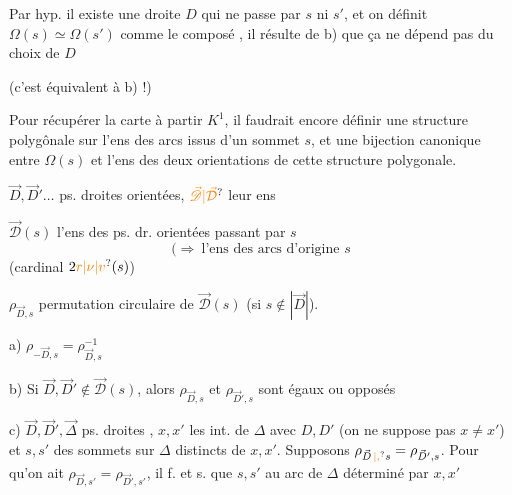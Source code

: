 Par hyp. il existe une droite $D$ qui ne passe
par $s$ ni $s'$, et  on définit $\Omega(s)\simeq\Omega(s')$ comme
le composé
, il résulte de b) que ça ne dépend pas du choix de $D$

(c'est  équivalent à b) !)

Pour  récupérer la carte à partir  $K^1$, il
faudrait encore définir une structure polygônale
sur l'ens des arcs issus d'un sommet $s$,
et une bijection canonique entre $\Omega(s)$ et
l'ens des deux orientations de cette structure
polygonale.

$\vec D,\vec D'\ldots$ ps. droites orientées, $\unsure{\vec{\mathscr D}|\vec{\mathcal D}}$ leur ens

$\vec{\mathscr D}(s)$ l'ens des ps. dr. orientées passant par $s$
\[
(\Longrightarrow\ \text{l'ens des arcs d'origine }s
\]
(cardinal $2\unsure{r|\nu|v}(s)$)

$\rho_{\vec D,s}$ permutation circulaire de $\vec{\mathscr D}(s)$ (si $s\notin|\vec D|$).

a) $\rho_{-\vec D,s}=\rho_{\vec D,s}^{-1}$

b) Si $\vec D,\vec D'\notin\vec{\mathscr D}(s)$, alors $\rho_{\vec D,s}$ et $\rho_{\vec D',s}$ sont égaux ou
opposés


c)  $\vec D,\vec D',\vec\Delta$ ps. droites , $x,x'$ les
int. de $\Delta$ avec $D,D'$ (on ne suppose pas $x\ne x'$)
et $s,s'$ des sommets sur $\Delta$ distincts de $x,x'$.
Supposons $\rho_{\vec D\unsure{\,|,}s}=\rho_{\vec D',s}$. Pour qu'on ait
$\rho_{\vec D,s'}=\rho_{\vec D',s'}$, il f. et s. que $s,s'$ 
au  arc de $\Delta$ déterminé par $x,x'$

